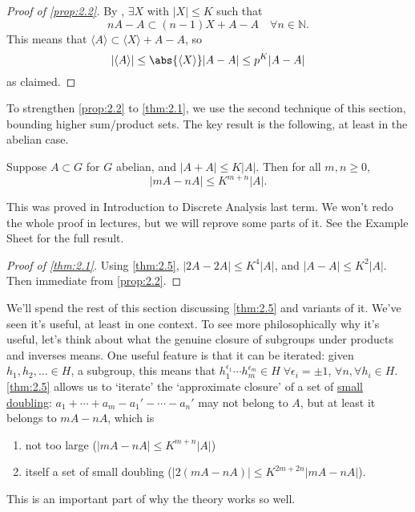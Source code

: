 \documentclass{article}
\numberwithin{equation}{section}
\begin{document}
\begin{proof}[Proof of \cref{prop:2.2}]
  By , $\exists X$ with $|X| \leq K$ such that
  \begin{equation*}
    nA - A \subset (n-1) X + A - A \quad \forall n \in \mathbb{N}.
  \end{equation*}
  This means that
  $\langle A \rangle \subset \langle X \rangle + A - A$, so
  \begin{equation*}
    |\langle A \rangle | \leq \abs{\langle X \rangle} |A-A| \leq p^K |A-A|
  \end{equation*}
  as claimed.
\end{proof}
To strengthen \cref{prop:2.2} to \cref{thm:2.1}, we use the second technique of this section, bounding higher sum/product sets. The key result is the following, at least in the abelian case.
\begin{nthm}\label{thm:2.5}
  Suppose $A \subset G$ for $G$ abelian, and $|A+A| \leq K|A|$.
  Then for all $m,n \geq 0$,
  \begin{equation*}|mA - nA| \leq K^{m+n} |A|.\end{equation*}
\end{nthm}
This was proved in Introduction to Discrete Analysis last term.
We won't redo the whole proof in lectures, but we will reprove some parts of it. See the Example Sheet for the full result.
\begin{proof}[Proof of \cref{thm:2.1}]
  Using \cref{thm:2.5}, $|2A - 2A| \leq K^4 |A|$, and $|A-A| \leq K^2 |A|$. Then immediate from \cref{prop:2.2}.
\end{proof}

We'll spend the rest of this section discussing \cref{thm:2.5} and variants of it.
We've seen it's useful, at least in one context. To see more philosophically why it's useful, let's think about what the genuine closure of subgroups under products and inverses means.
One useful feature is that it can be iterated: given $h_1, h_2, \dotsc \in H$, a subgroup, this means that $h_1^{\epsilon_1} \dotsm h_m^{\epsilon_m} \in H\; \forall \epsilon_i = \pm 1$, $\forall n, \forall h_i \in H$.
\cref{thm:2.5} allows us to `iterate' the `approximate closure' of a set of \hyperlink{def:doubling}{small doubling}:
$a_1 + \dotsb + a_m - a_1' - \dotsb - a_n'$ may not belong to $A$, but at least it belongs to $mA - nA$, which is
\begin{enumerate}[label=(\alph*)]
  \item not too large ($|mA - nA| \leq K^{m+n} |A|$)
  \item itself a set of small doubling ($|2(mA-nA)| \leq K^{2m+2n} |mA - nA|$).
\end{enumerate}
This is an important part of why the theory works so well.
\end{document}
